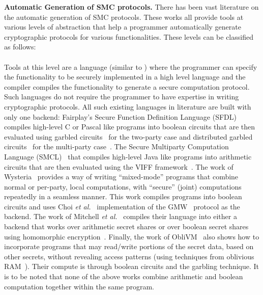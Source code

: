 \noindent\textbf{Automatic Generation of SMC protocols.}
There has been vast literature on the automatic generation of SMC protocols. These works all provide tools at various levels of abstraction that help a programmer automatically generate cryptographic protocols for various functionalities. These levels can be classified as follows: 
\\\\
 Tools at this level are a language (similar to \tool) where the programmer can specify the functionality to be securely implemented in a high level language and the compiler compiles the functionality to generate a secure computation protocol. Such languages do not require the programmer to have expertise in writing cryptographic protocols. All such existing languages in literature are built with only one backend: Fairplay's Secure Function Definition Language (SFDL)~\cite{fairplay,fairplaymp} compiles high-level C or Pascal like programs into boolean circuits that are then evaluated using garbled circuits~\cite{yao} for the two-party case and distributed garbled circuits~\cite{bmr} for the multi-party case~\cite{bmr}. The Secure Multiparty Computation Language (SMCL)~\cite{smcl} that compiles high-level Java like programs into arithmetic circuits that are then evaluated using the VIFF framework~\cite{viff}. The work of Wysteria~\cite{wysteria} provides a way of writing ``mixed-mode'' programs that combine normal or per-party, local computations, with ``secure'' (joint) computations repeatedly in a seamless manner. This work compiles programs into boolean circuits and uses Choi {\em et al.}~\cite{choi} implementation of the GMW~\cite{gmw} protocol as the backend. The work of Mitchell {\em et al.}~\cite{lambdaps} compiles their language into either a backend that works over arithmetic secret shares or over boolean secret shares using homomorphic encryption~\cite{gentry}. Finally, the work of ObliVM~\cite{oblivm} also shows how to incorporate programs that may read/write portions of the secret data, based on other secrets, without revealing access patterns (using techniques from oblivious RAM~\cite{oram1,oram2}). Their compute is through boolean circuits and the garbling technique. It is to be noted that none of the above works combine arithmetic and boolean computation together within the same program. 
\\\\
